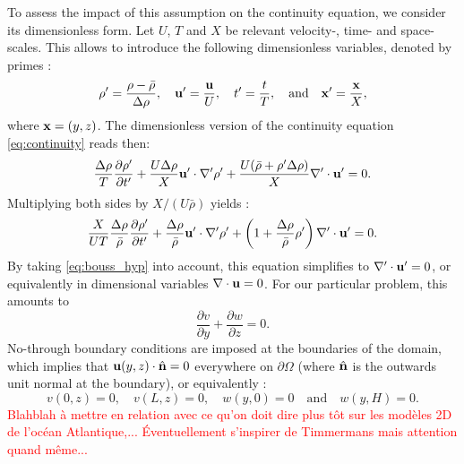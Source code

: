 To assess the impact of this assumption on the continuity equation, we consider its dimensionless form. Let $U$, $T$ and $X$ be relevant velocity-, time- and space-scales. This allows to introduce the following dimensionless variables, denoted by primes :
\begin{equation}
	\rho' = \frac{\rho - \bar{\rho}}{\Delta \rho}, \quad \mathbf u' = \frac{\mathbf u}{U}, \quad t' = \frac{t}{T}, \quad \mbox{and} \quad \mathbf x' = \frac{\mathbf x}{X},
\end{equation}
where $\mathbf x = (y,z)$. The dimensionless version of the continuity equation \eqref{eq:continuity} reads then: 
\begin{equation}
	\frac{\Delta \rho}{T}\frac{\partial \rho'}{\partial t'} + \frac{U\Delta \rho}{X}\mathbf u' \cdot \nabla' \rho' + \frac{U(\bar{\rho}+ \rho' \Delta \rho)}{X}\nabla' \cdot \mathbf u' = 0.
\end{equation}
Multiplying both sides by $X/(U\bar{\rho})$ yields :
\begin{equation}
	\frac{X}{UT}\frac{\Delta \rho}{\bar{\rho}}\frac{\partial \rho'}{\partial t'} + \frac{\Delta \rho}{\bar{\rho}}\mathbf u' \cdot \nabla' \rho' + \left(1+\frac{\Delta \rho}{\bar{\rho}}\rho'\right)\nabla' \cdot \mathbf u' = 0.
\end{equation}
By taking \eqref{eq:bouss_hyp} into account, this equation simplifies to $\nabla' \cdot \mathbf u' = 0$, or equivalently in dimensional variables $\nabla \cdot \mathbf u = 0$. For our particular problem, this amounts to
\begin{equation}
	\frac{\partial v}{\partial y} + \frac{\partial w}{\partial z} = 0.
\end{equation}
No-through boundary conditions are imposed at the boundaries of the domain, which implies that $\mathbf u(y,z) \cdot \hat{\mathbf{n}} = 0$ everywhere on $\partial \Omega$ (where $\hat{\mathbf{n}}$ is the outwards unit normal at the boundary), or equivalently :
\begin{equation} \label{eq:overturnerBC}
	v(0,z) = 0, \quad v(L,z) = 0, \quad w(y,0) = 0 \quad \mbox{and} \quad w(y,H) = 0.
\end{equation}
\textcolor{red}{Blahblah à mettre en relation avec ce qu'on doit dire plus tôt sur les modèles 2D de l'océan Atlantique,... Éventuellement s'inspirer de Timmermans mais attention quand même...}

